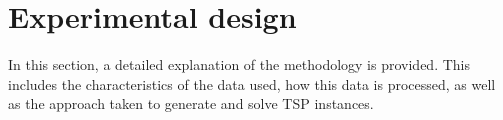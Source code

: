 \section{Experimental design}
In this section, a detailed explanation of the methodology is provided. This includes the 
characteristics of the data used, how this data is processed, as well as the approach taken to 
generate and solve TSP instances.






